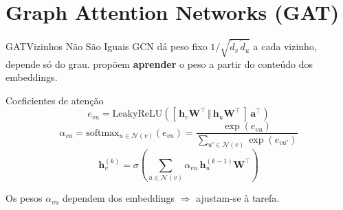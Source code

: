 \documentclass[aspectratio=169,xcolor=dvipsnames]{beamer}
\begin{document}
  \section{Graph Attention Networks (GAT)}

  \begin{frame}{GAT}{Vizinhos Não São Iguais}
    GCN dá peso fixo $1/\sqrt{\tilde d_v\, \tilde d_u}$ a cada vizinho, depende só
    do grau.  propõem \textbf{aprender} o peso
    a partir do conteúdo dos embeddings.

    \vspace{0.5em}
    \begin{block}{Coeficientes de atenção}
      \[
        e_{vu} = \mathrm{LeakyReLU}\!\left(
          [\,\mathbf{h}_v \mathbf{W}^{\top} \,\Vert\, \mathbf{h}_u \mathbf{W}^{\top}\,]\, \mathbf{a}^{\top}
        \right)
      \]
      \[
        \alpha_{vu} = \mathrm{softmax}_{u \in \mathcal{N}(v)}(e_{vu})
        = \frac{\exp(e_{vu})}{\sum_{u' \in \mathcal{N}(v)} \exp(e_{vu'})}
      \]
      \[
        \mathbf{h}^{(k)}_v = \sigma\!\left(\sum_{u \in \mathcal{N}(v)} \alpha_{vu}\, \mathbf{h}^{(k-1)}_u \mathbf{W}^{\top}\right)
      \]
    \end{block}

    \vspace{0.3em}
    Os pesos $\alpha_{vu}$ dependem dos embeddings $\Rightarrow$ ajustam-se à
    tarefa.
  \end{frame}
\end{document}
